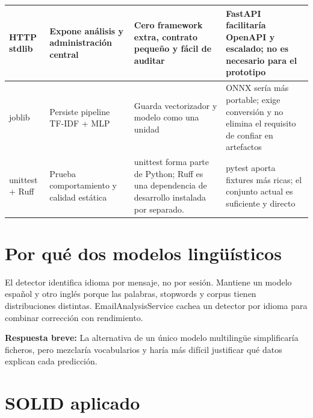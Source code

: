 \documentclass[11pt,a4paper]{article}
\begin{document}
\begin{xltabular}{\textwidth}{|>{\raggedright\arraybackslash}p{2.45cm}|X|X|X|}
    \hline
    HTTP stdlib & Expone análisis y administración central & Cero framework extra, contrato pequeño y fácil de auditar & FastAPI facilitaría OpenAPI y escalado; no es necesario para el prototipo \\
    \hline
    joblib & Persiste pipeline TF-IDF + MLP & Guarda vectorizador y modelo como una unidad & ONNX sería más portable; exige conversión y no elimina el requisito de confiar en artefactos \\
    \hline
    unittest + Ruff & Prueba comportamiento y calidad estática & unittest forma parte de Python; Ruff es una dependencia de desarrollo instalada por separado. & pytest aporta fixtures más ricas; el conjunto actual es suficiente y directo \\
    \hline
  \end{xltabular}
\endgroup

\section{Por qué dos modelos lingüísticos}

El detector identifica idioma por mensaje, no por sesión. Mantiene un modelo español y otro inglés porque las palabras, stopwords y corpus tienen distribuciones distintas. EmailAnalysisService cachea un detector por idioma para combinar corrección con rendimiento.

\begin{tcolorbox}[colback=uemclight,colframe=uemcgreen,title=Nota para la defensa]
\textbf{Respuesta breve:} La alternativa de un único modelo multilingüe simplificaría ficheros, pero mezclaría vocabularios y haría más difícil justificar qué datos explican cada predicción.
\end{tcolorbox}

\section{SOLID aplicado}
\end{document}
